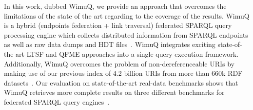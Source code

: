 


In this work, dubbed WimuQ, we provide an approach that overcomes the limitations of the state of the art regarding to the coverage of the results. WimuQ is a hybrid (endpoints federation + link traversal) federated SPARQL query processing engine which collects distributed information from SPARQL endpoints as well as raw data dumps and HDT files~\cite{j.websem328}. WimuQ integrates exciting state-of-the-art LTSF and QFME approaches into a single query execution framework.   Additionally, WimuQ overcomes the problem of non-dereferenceable URIs by making use of our previous index of 4.2 billion URIs from more than 660k RDF datasets~\cite{valdestilhas2018my}. Our evaluation on state-of-the-art real-data benchmarks shows that WimuQ retrieves more complete results on three different benchmarks for federated SPARQL query engines~\cite{fedbench2011,feasible2015,saleem2018largerdfbench}. 




